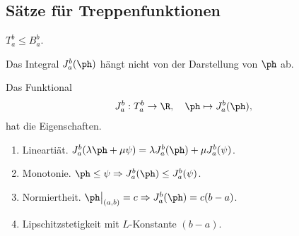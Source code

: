 \subsection{Sätze für Treppenfunktionen}
\begin{prop}
$T_a^b \le B_a^b$.
\end{prop}
\begin{prop}
Das Integral $J_a^b(\ph)$ hängt nicht von der Darstellung von $\ph$ ab.
\end{prop}
\begin{prop}
Das Funktional
\begin{align*}
J_a^b : T_a^b \to \R,\quad\ph \mapsto J_a^b(\ph),
\end{align*}
hat die Eigenschaften.
\begin{enumerate}
  \item Lineartiät. $J_a^b(\lambda \ph + \mu \psi) = \lambda J_a^b(\ph) + \mu
  J_a^b(\psi)$.
  \item Monotonie. $\ph \le \psi \Rightarrow J_a^b(\ph) \le J_a^b(\psi)$.
  \item Normiertheit. $\ph\big|_{(a,b)} = c \Rightarrow J_a^b(\ph) = c(b-a)$.
  \item Lipschitzstetigkeit mit $L$-Konstante $(b-a)$.
\end{enumerate}
\end{prop}

